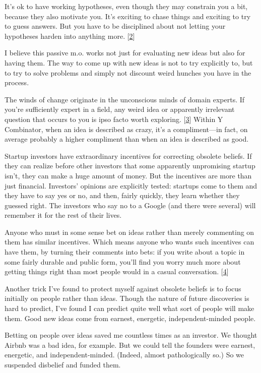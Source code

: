 It's ok to have working hypotheses, even though they may constrain you a
bit, because they also motivate you. It's exciting to chase things and
exciting to try to guess answers. But you have to be disciplined about
not letting your hypotheses harden into anything more.
{[}\hyperref[f2n]{2}{]}

I believe this passive m.o. works not just for evaluating new ideas but
also for having them. The way to come up with new ideas is not to try
explicitly to, but to try to solve problems and simply not discount
weird hunches you have in the process.

The winds of change originate in the unconscious minds of domain
experts. If you're sufficiently expert in a field, any weird idea or
apparently irrelevant question that occurs to you is ipso facto worth
exploring. {[}\hyperref[f3n]{3}{]} Within Y Combinator, when an idea is
described as crazy, it's a compliment---in fact, on average probably a
higher compliment than when an idea is described as good.

Startup investors have extraordinary incentives for correcting obsolete
beliefs. If they can realize before other investors that some apparently
unpromising startup isn't, they can make a huge amount of money. But the
incentives are more than just financial. Investors' opinions are
explicitly tested: startups come to them and they have to say yes or no,
and then, fairly quickly, they learn whether they guessed right. The
investors who say no to a Google (and there were several) will remember
it for the rest of their lives.

Anyone who must in some sense bet on ideas rather than merely commenting
on them has similar incentives. Which means anyone who wants such
incentives can have them, by turning their comments into bets: if you
write about a topic in some fairly durable and public form, you'll find
you worry much more about getting things right than most people would in
a casual conversation. {[}\hyperref[f4n]{4}{]}

Another trick I've found to protect myself against obsolete beliefs is
to focus initially on people rather than ideas. Though the nature of
future discoveries is hard to predict, I've found I can predict quite
well what sort of people will make them. Good new ideas come from
earnest, energetic, independent-minded people.

Betting on people over ideas saved me countless times as an investor. We
thought Airbnb was a bad idea, for example. But we could tell the
founders were earnest, energetic, and independent-minded. (Indeed,
almost pathologically so.) So we suspended disbelief and funded them.

